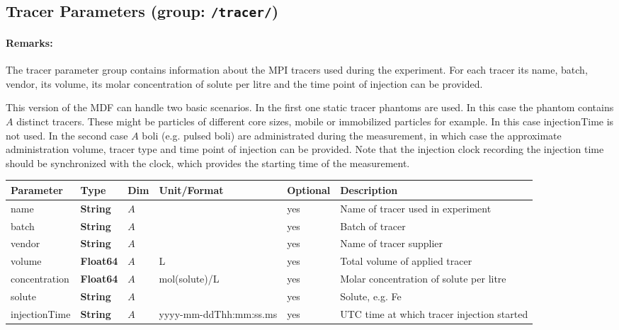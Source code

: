 \documentclass[landscape,a4paper]{article} %
\newcommand{\inl}[1]{\lstinline[columns=fixed]{#1}}
\newcommand{\inltab}[1]{{\ttfamily\bfseries\color{blue}#1}}
\newcommand{\inlvar}[1]{{\ttfamily#1}}
\begin{document}
\subsection{Tracer Parameters (group: \inl{/tracer/})}

\begin{multicols}{2}
\paragraph{Remarks:} The tracer parameter group contains information about the MPI tracers used during the experiment. For each tracer its \inlvar{name}, \inlvar{batch}, \inlvar{vendor}, its \inlvar{volume}, its molar \inlvar{concentration} of \inlvar{solute} per litre and the time point of injection can be provided.

This version of the MDF can handle two basic scenarios. In the first one static tracer phantoms are used. In this case the phantom contains $A$ distinct tracers. These might be particles of different core sizes, mobile or immobilized particles for example. In this case \inlvar{injectionTime} is not used. In the second case $A$ boli (e.g. pulsed boli) are administrated during the measurement, in which case the approximate administration volume, tracer type and time point of injection can be provided. Note that the injection clock recording the injection time should be synchronized with the clock, which provides the starting time of the measurement.
\end{multicols}

\noindent \begin{tabularx}{\columnwidth}{lllllX} 
\textbf{Parameter} & \textbf{Type} & \textbf{Dim} & \textbf{Unit/Format} & \textbf{Optional} & \textbf{Description} \\ \hline 
\inlvar{name} & \inltab{String} & $A$ & & yes & Name of tracer used in experiment \\ \hline
\inlvar{batch} & \inltab{String} & $A$ & & yes & Batch of tracer \\ \hline
\inlvar{vendor} & \inltab{String} & $A$ & & yes & Name of tracer supplier \\ \hline
\inlvar{volume} & \inltab{Float64} & $A$ & L & yes & Total volume of applied tracer \\ \hline
\inlvar{concentration} & \inltab{Float64} & $A$ & mol(solute)/L & yes & Molar concentration of solute per litre \\ \hline
\inlvar{solute} & \inltab{String} & $A$ & & yes & Solute, e.g. Fe \\ \hline
\inlvar{injectionTime} & \inltab{String} & $A$ & yyyy-mm-ddThh:mm:ss.ms & yes & UTC time at which tracer injection started \\ \hline
\end{tabularx}
\end{document}
